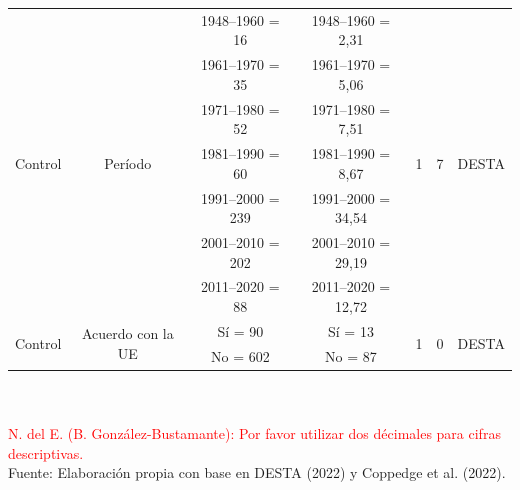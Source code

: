\documentclass[a4paper]{tufte-handout}
\begin{document}
\begin{table}[h]
\begin{tabular}{c c c c c c c}
    \multirow{7}{*}{Control} & \multirow{7}{*}{Período} & 1948--1960 = 16 & 1948--1960 = 2,31 & \multirow{7}{*}{1} & \multirow{7}{*}{7} & \multirow{7}{*}{DESTA} \\
    & & 1961--1970 = 35 & 1961--1970 = 5,06 & & & \\ 
    & & 1971--1980 = 52 & 1971--1980 = 7,51 & & & \\
    & & 1981--1990 = 60 & 1981--1990 = 8,67 & & & \\ 
    & & 1991--2000 = 239 & 1991--2000 = 34,54 & & & \\
    & & 2001--2010 = 202 & 2001--2010 = 29,19 & & & \\ 
    & & 2011--2020 = 88 & 2011--2020 = 12,72 & & & \\ \midrule
    \multirow{2}{*}{Control} & \multirow{2}{*}{Acuerdo con la UE} & Sí = 90 & Sí = 13 & \multirow{2}{*}{1} & \multirow{2}{*}{0} & \multirow{2}{*}{DESTA} \\
    & & No = 602 & No = 87 &  &  & \\ \bottomrule
  \end{tabular}
  \\~\\ \smallskip\noindent\scriptsize \textcolor{red}{N. del E. (B. González-Bustamante): Por favor utilizar dos décimales para cifras descriptivas.} \\ Fuente: Elaboración propia con base en DESTA (2022) y Coppedge et al. (2022).
\end{table}
\end{document}
